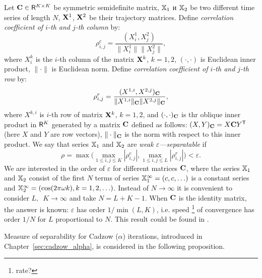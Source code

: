 \documentclass[12pt,a4paper,fleqn,leqno]{article}
\begin{document}
Let $\mathbf{C} \in \mathsf{R}^{K \times K}$ be symmetric semidefinite matrix, $\mathbb{X}_1$ и $\mathbb{X}_2$ be two different time series of length $N$, $\mathbf{X}^1$, $\mathbf{X}^2$ be their trajectory matrices. Define \emph{correlation coefficient of $i$-th and $j$-th column} by:
\begin{equation}\label{col_corr}
\rho^c_{i,j} = \frac{(X^1_i, X^2_j)}{\|X^1_i\| \|X^2_j\|},
\end{equation}
where $X^k_i$ is the $i$-th column of the matrix $\mathbf{X}^k$, $k = 1, 2$, $(\cdot, \cdot)$ is Euclidean inner product, $\|\cdot\|$ is Euclidean norm. Define \emph{correlation coefficient of $i$-th and $j$-th row} by:
\begin{equation}\label{row_corr}
\rho^r_{i,j} = \frac{(X^{1,i}, X^{2,j})_{\mathbf{C}}}{\|X^{1,i}\|_{\mathbf{C}} \|X^{2,j}\|_{\mathbf{C}}},
\end{equation}
where $X^{k,i}$ is $i$-th row of matrix $\mathbf{X}^k$, $k = 1, 2$, and $(\cdot, \cdot)_{\mathbf{C}}$ is thr oblique inner product in $\mathsf{R}^K$ generated by a matrix $\mathbf{C}$ defined as follows: $(X, Y)_{\mathbf{C}} = X \mathbf{C} Y^{\mathsf{T}}$ (here $X$ and $Y$ are row vectors), $\| \cdot \|_{\mathbf{C}}$ is the norm with respect to this inner product. We say that series $\mathbb{X}_1$ and $\mathbb{X}_2$ are \emph{weak $\varepsilon$---separatable} if
\begin{equation}\label{weak_sep_eq}
\rho = \max\Big(\max_{1 \le i,j \le K}|\rho^c_{i,j}|, \max_{1 \le i,j \le L}|\rho^r_{i,j}|\Big) < \varepsilon.
\end{equation}
We are interested in the order of $\varepsilon$ for different matrices $\mathbf{C}$, where the series $\mathbb{X}_1$ and $\mathbb{X}_2$ consist of the first $N$ terms of series $\mathbb{X}_1^\infty = (c, c, \ldots)$ is a constant series and $\mathbb{X}_2^\infty = (\cos(2 \pi \omega k), k = 1, 2, \ldots)$. Instead of $N \to \infty$ it is convenient to consider $L,$~$K \to \infty$ and take $N = L + K - 1$. When $\mathbf{C}$ is the identity matrix, the answer is known: $\varepsilon$ has order $1/\min(L,K)$, i.e. speed \footnote{rate?} of convergence has order $1/N$ for $L$ proportional to $N$.
This result could be found in \cite[Chapter 6.1]{Golyandina.etal2001}. %

Measure of separability for Cadzow ($\alpha$) iterations, introduced in Chapter~\ref{sec:cadzow_alpha}, is considered in the following proposition.
\end{document}

